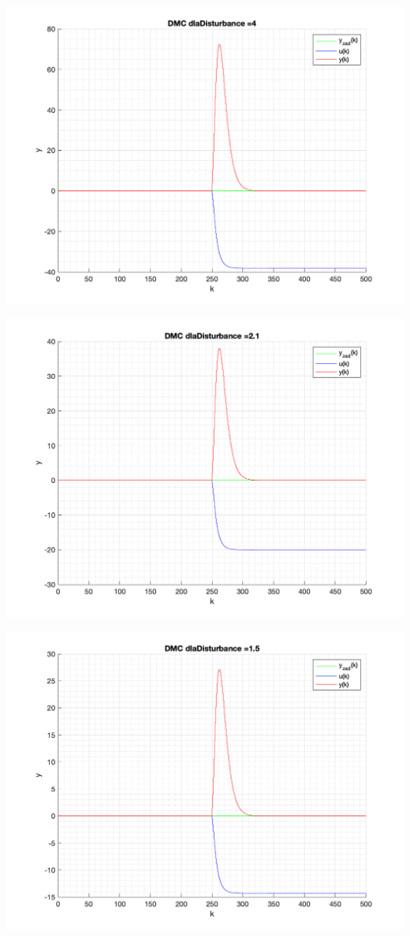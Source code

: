 \documentclass[a4paper, 11pt]{article}
\begin{document}
\begin{enumerate}
 \includegraphics[width=\linewidth]{./ModelsP4_Disturbance/P4_DMC_Disturbance_4_png.png} 
 
 \includegraphics[width=\linewidth]{./ModelsP4_Disturbance/P4_DMC_Disturbance_2_1_png.png} 
 
 \includegraphics[width=\linewidth]{./ModelsP4_Disturbance/P4_DMC_Disturbance_1_5_png.png} 
 

\end{enumerate}
\end{document}
